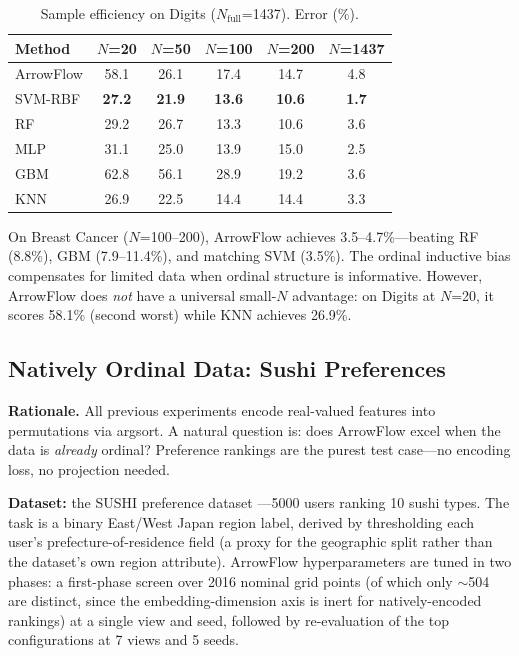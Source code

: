 \documentclass[12pt]{article}
\begin{document}
\begin{table}[ht]
\centering
\caption{Sample efficiency on Digits ($N_{\mathrm{full}}$=1437). Error (\%).}
\label{tab:sample-dig}
\begin{tabular}{lccccc}
\toprule
Method & $N$=20 & $N$=50 & $N$=100 & $N$=200 & $N$=1437 \\
\midrule
ArrowFlow & 58.1 & 26.1 & 17.4 & 14.7 & 4.8 \\
SVM-RBF   & \textbf{27.2} & \textbf{21.9} & \textbf{13.6} & \textbf{10.6} & \textbf{1.7} \\
RF        & 29.2 & 26.7 & 13.3 & 10.6 & 3.6 \\
MLP       & 31.1 & 25.0 & 13.9 & 15.0 & 2.5 \\
GBM   & 62.8 & 56.1 & 28.9 & 19.2 & 3.6 \\
KNN       & 26.9 & 22.5 & 14.4 & 14.4 & 3.3 \\
\bottomrule
\end{tabular}
\end{table}

On Breast Cancer ($N$=100--200), ArrowFlow achieves 3.5--4.7\%---beating RF (8.8\%), GBM (7.9--11.4\%), and matching SVM (3.5\%). The ordinal inductive bias compensates for limited data when ordinal structure is informative. However, ArrowFlow does \emph{not} have a universal small-$N$ advantage: on Digits at $N$=20, it scores 58.1\% (second worst) while KNN achieves 26.9\%.

\subsection{Natively Ordinal Data: Sushi Preferences}
\label{sec:sushi}

\textbf{Rationale.} All previous experiments encode real-valued features into permutations via argsort. A natural question is: does ArrowFlow excel when the data is \emph{already} ordinal? Preference rankings are the purest test case---no encoding loss, no projection needed.

\textbf{Dataset:} the SUSHI preference dataset \citep{kamishima2003sushi}---5000 users ranking 10 sushi types. The task is a binary East/West Japan region label, derived by thresholding each user's prefecture-of-residence field (a proxy for the geographic split rather than the dataset's own region attribute). ArrowFlow hyperparameters are tuned in two phases: a first-phase screen over 2016 nominal grid points (of which only $\sim$504 are distinct, since the embedding-dimension axis is inert for natively-encoded rankings) at a single view and seed, followed by re-evaluation of the top configurations at 7 views and 5 seeds.
\end{document}
